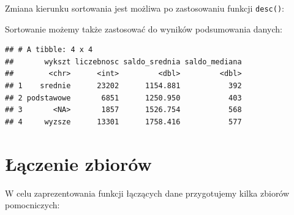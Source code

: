 \documentclass[]{book}
\newenvironment{Shaded}{\begin{snugshade}}{\end{snugshade}}
\newcommand{\KeywordTok}[1]{\textcolor[rgb]{0.13,0.29,0.53}{\textbf{#1}}}
\newcommand{\DataTypeTok}[1]{\textcolor[rgb]{0.13,0.29,0.53}{#1}}
\newcommand{\StringTok}[1]{\textcolor[rgb]{0.31,0.60,0.02}{#1}}
\newcommand{\OperatorTok}[1]{\textcolor[rgb]{0.81,0.36,0.00}{\textbf{#1}}}
\newcommand{\NormalTok}[1]{#1}
\begin{document}
\begin{Shaded}
\end{Shaded}

Zmiana kierunku sortowania jest możliwa po zastosowaniu funkcji
\texttt{desc()}:

\begin{Shaded}
\end{Shaded}

Sortowanie możemy także zastosować do wyników podsumowania danych:

\begin{Shaded}
\end{Shaded}

\begin{verbatim}
## # A tibble: 4 x 4
##       wykszt liczebnosc saldo_srednia saldo_mediana
##        <chr>      <int>         <dbl>         <dbl>
## 1    srednie      23202      1154.881           392
## 2 podstawowe       6851      1250.950           403
## 3       <NA>       1857      1526.754           568
## 4     wyzsze      13301      1758.416           577
\end{verbatim}

\section{Łączenie zbiorów}\label{aczenie-zbiorow}

W celu zaprezentowania funkcji łączących dane przygotujemy kilka zbiorów
pomocniczych:
\end{document}
